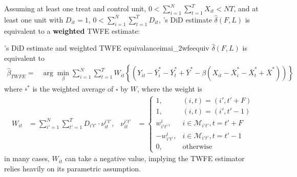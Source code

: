 \documentclass[twoside]{article}
\begin{document}
Assuming at least one treat and control unit, $0<\sum^N_{i=1}\sum^T_{t=1}X_{it}<NT$, and at least one unit with $D_{it}=1$, $0<\sum^N_{i=1}\sum^T_{t=1}D_{it}$, \citet{imai2023matching}'s DiD estimate $\hat{\delta}\left(F,L\right)$ is equivalent to a \textbf{weighted} TWFE estimate:
\begin{theorem}{\citet{imai2023matching}'s DiD estimate and weighted TWFE equivalance}{imai_2wfeequiv}
    $\hat{\delta}(F,L)$ is equivalent to 
    \begin{align*}
        \hat{\beta}_{TWFE} = & \arg\min_{\beta} \sum^N_{i=1}\sum^T_{t=1}W_{it}\left\{ \left(Y_{it}-\bar{Y}^*_i-\bar{Y}^*_t+\bar{Y}^* - \beta \left( X_{it}-\bar{X}^*_i-\bar{X}^*_t+\bar{X}^* \right) \right) \right\}
    \end{align*}
    where $\bar{\square}^*$ is the weighted average of $\square$ by $W$, where the weight is 
    \begin{align*}
        W_{it}&= \sum^N_{i'=1}\sum^T_{t'=1} D_{i't'}\cdot \nu^{i't'}_{it}, & \nu^{i't'}_{it}&= \begin{cases}
            1, & (i,t)=(i',t'+F)\\
            1, & (i,t)=(i',t'-1)\\
            w^i_{i't'}, & i\in\mathcal{M}_{i't'},t=t'+F\\
            -w^i_{i't'}, & i\in\mathcal{M}_{i't'},t=t'-1\\
            0,&\text{otherwise}
        \end{cases}
    \end{align*}
    in many cases, $W_{it}$ can take a negative value, implying the TWFE estimator relies heavily on its parametric assumption.
\end{theorem}
\end{document}

